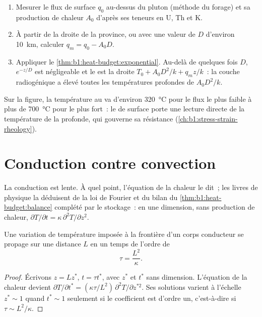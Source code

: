\begin{method}\label{met:b1:heat-budget:moho}
\begin{enumerate}
  \item Mesurer le flux de surface $q_0$ au-dessus du pluton (méthode du forage)
        et sa production de chaleur $A_0$ d'après ses teneurs en U, Th et K.
  \item À partir de la droite de la province, ou avec une valeur de $D$
        d'environ \qty{10}{km}, calculer $q_m = q_0 - A_0 D$.
  \item Appliquer le \cref{thm:b1:heat-budget:exponential}. Au-delà de quelques fois $D$,
        $e^{-z/D}$ est négligeable et le  est la droite
        $T_0 + A_0D^2/k + q_m z/k$~: la couche radiogénique a élevé toutes les
        températures profondes de $A_0D^2/k$.
\end{enumerate}
\end{method}

Sur la figure, la température au  va d'environ \qty{320}{\degreeCelsius}
pour le flux le plus faible à plus de \qty{700}{\degreeCelsius} pour le plus fort~: le  de surface porte une lecture directe de la
température de la  profonde, qui gouverne sa résistance
(\cref{ch:b1:stress-strain-rheology}).

\section{Conduction contre convection}

La conduction est lente. À quel point, l'équation de la chaleur le dit~; les
livres de physique la déduisent de la loi de Fourier et du bilan du
\cref{thm:b1:heat-budget:balance} complété par le stockage~: en une dimension,
sans production de chaleur,
$\partial T/\partial t = \kappa\,\partial^2 T/\partial z^2$.

\begin{proposition}\label{prop:b1:heat-budget:timescale}
Une variation de température imposée à la frontière d'un corps conducteur se
propage sur une distance $L$ en un temps de l'ordre de
\[
  \tau = \frac{L^2}{\kappa} .
\]
\end{proposition}

\begin{proof}
Écrivons $z = L z^*$, $t = \tau t^*$, avec $z^*$ et $t^*$ sans dimension. L'équation
de la chaleur devient $\partial T/\partial t^* = (\kappa\tau/L^2)\,\partial^2
T/\partial z^{*2}$. Ses solutions varient à l'échelle $z^* \sim 1$ quand $t^* \sim 1$
seulement si le coefficient est d'ordre un, c'est-à-dire si $\tau \sim L^2/\kappa$.
\end{proof}

